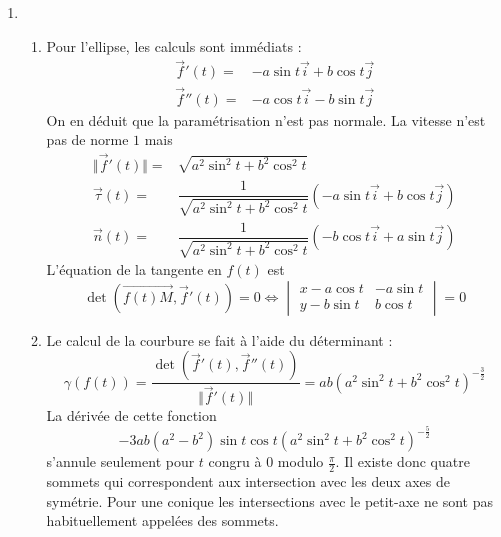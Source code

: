 \begin{enumerate}
\item 
\begin{enumerate}
 \item Pour l'ellipse, les calculs sont immédiats :
\begin{align*}
 \overrightarrow f'(t)=& -a\sin t \overrightarrow i + b\cos t \overrightarrow j \\
\overrightarrow f''(t)=& -a\cos t \overrightarrow i - b\sin t \overrightarrow j 
\end{align*}
On en déduit que la paramétrisation n'est pas normale. La vitesse n'est pas de norme $1$ mais
\begin{align*}
 \Vert  \overrightarrow f'(t)\Vert =& \sqrt{a^2\sin^2 t+ b^2\cos^2 t}\\
\overrightarrow{\tau}(t) =& \dfrac{1}{\sqrt{a^2\sin^2 t+ b^2\cos^2 t}}
\left( -a\sin t \overrightarrow i + b\cos t \overrightarrow j\right) \\
\overrightarrow{n} (t) =& \dfrac{1}{\sqrt{a^2\sin^2 t + b^2\cos^2 t}}
\left(-b\cos t \overrightarrow i + a\sin t \overrightarrow j\right) 
\end{align*}
L'équation de la tangente en $f(t)$ est
\begin{displaymath}
 \det(\overrightarrow{f(t)M},\overrightarrow f'(t))=0
\Leftrightarrow
\begin{vmatrix}
 x-a\cos t & -a\sin t \\
y-b\sin t & b\cos t 
\end{vmatrix}
=0
\end{displaymath}

\item Le calcul de la courbure se fait à l'aide du déterminant :
\begin{displaymath}
 \gamma(f(t))=
\dfrac{\det(\overrightarrow f'(t),\overrightarrow f''(t))}{\Vert \overrightarrow f'(t)\Vert}
=ab(a^2\sin^2 t +b^2\cos^2 t)^{-\frac{3}{2}}
\end{displaymath}
La dérivée de cette fonction
\begin{displaymath}
 -3ab(a^2-b^2)\sin t \cos t(a^2\sin^2 t +b^2\cos^2 t)^{-\frac{5}{2}}
\end{displaymath}
s'annule seulement pour $t$ congru à $0$ modulo $\frac{\pi}{2}$. Il existe donc quatre sommets qui correspondent aux intersection avec les deux axes de symétrie. Pour une conique les intersections avec le petit-axe ne sont pas habituellement appelées des sommets.
\end{enumerate}
\end{enumerate}

